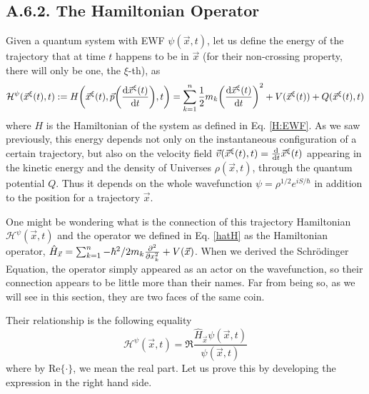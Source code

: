 \documentclass[11pt, a4paper]{article} %
\newcommand{\h}{\mathcal{H}}
\begin{document}

\subsection*{A.6.2. The Hamiltonian Operator}
Given a quantum system with EWF $\psi(\vec{x},t)$, let us define the energy of the trajectory that at time $t$ happens to be in $\vec{x}$ (for their non-crossing property, there will only be one, the $\xi$-th), as
\begin{equation}
\h^\psi(\vec{x}^\xi(t), t):=H\qty(\vec{x}^\xi(t), \vec{p}\qty(\dv{\vec{x}^\xi(t)}{t}), t)=\sum_{k=1}^n \frac{1}{2}m_k\qty(\dv{\vec{x}^\xi(t)}{t})^2+V(\vec{x}^\xi(t))+Q(\vec{x}^\xi(t),t)
\end{equation}
where $H$ is the Hamiltonian of the system as defined in Eq. \eqref{H:EWF}. As we saw previously, this energy depends not only on the instantaneous configuration of a certain trajectory, but also on the velocity field $\vec{v}(\vec{x}^\xi(t),t)=\dv{}{t}\vec{x}^\xi(t)$ appearing in the kinetic energy and the density of Universes $\rho(\vec{x},t)$, through the quantum potential $Q$. Thus it depends on the whole wavefunction $\psi=\rho^{1/2}e^{iS/\hbar}$ in addition to the position for a trajectory $\vec{x}$.

One might be wondering what is the connection of this trajectory Hamiltonian $\h^\psi(\vec{x},t)$ and the operator we defined in Eq. \eqref{hatH} as the Hamiltonian operator, $\hat{H}_{\vec{x}}=\sum_{k=1}^n-\hbar^2/2m_k\pdv[2]{}{x_k}+V(\vec{x})$. When we derived the Schrödinger Equation, the operator simply appeared as an actor on the wavefunction, so their connection appears to be little more than their names. Far from being so, as we will see in this section, they are two faces of the same coin.

Their relationship is the following equality
\begin{equation}\label{117}
\h^\psi(\vec{x},t)=\Re{\frac{\hat{H}_{\vec{x}}\psi(\vec{x},t)}{\psi(\vec{x},t)}}
\end{equation}
where by Re$\{\cdot\}$, we mean the real part. Let us prove this by developing the expression in the right hand side.
\end{document}
